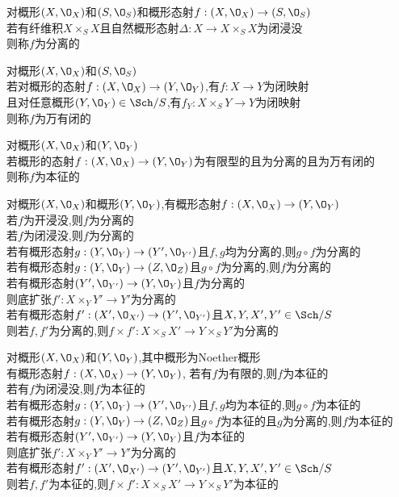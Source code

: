 \begin{dingyi}
对概形$(X,\O_{X})$和$(S,\O_{S})$和概形态射$f:(X,\O_{X})\to(S,\O_{S})$\\
若有纤维积$X\times_{S}X$且自然概形态射$\Delta:X\to X\times_{S}X$为闭浸没\\
则称$f$为分离的
\end{dingyi}

\begin{dingyi}
对概形$(X,\O_{X})$和$(S,\O_{S})$\\
若对概形的态射$f:(X,\O_{X})\to (Y,\O_{Y})$,有$f:X\to Y$为闭映射\\
且对任意概形$(Y,\O_{Y})\in\Sch/S$,有$f_{Y}:X\times_{S}Y\to Y$为闭映射\\
则称$f$为万有闭的
\end{dingyi}

\begin{dingyi}
对概形$(X,\O_{X})$和$(Y,\O_{Y})$\\
若概形的态射$f:(X,\O_{X})\to (Y,\O_{Y})$为有限型的且为分离的且为万有闭的\\
则称$f$为本征的
\end{dingyi}

\begin{dingli}
对概形$(X,\O_{X})$和概形$(Y,\O_{Y})$,有概形态射$f:(X,\O_{X})\to(Y,\O_{Y})$\\
若$f$为开浸没,则$f$为分离的\\
若$f$为闭浸没,则$f$为分离的\\
若有概形态射$g:(Y,\O_{Y})\to(Y',\O_{Y'})$且$f,g$均为分离的,则$g\circ f$为分离的\\
若有概形态射$g:(Y,\O_{Y})\to (Z,\O_{Z})$且$g\circ f$为分离的,则$f$为分离的\\
若有概形态射$(Y',\O_{Y'})\to (Y,\O_{Y})$且$f$为分离的\\
则底扩张$f':X\times_{Y} Y'\to Y'$为分离的\\
若有概形态射$f':(X',\O_{X'})\to (Y',\O_{Y'})$且$X,Y,X',Y'\in \Sch/S$\\
则若$f,f'$为分离的,则$f\times f':X\times_{S} X'\to Y\times_{S} Y'$为分离的
\end{dingli}

\begin{dingli}
对概形$(X,\O_{X})$和$(Y,\O_{Y})$,其中概形为Noether概形\\
有概形态射$f:(X,\O_{X})\to (Y,\O_{Y})$,
若有$f$为有限的,则$f$为本征的\\
若有$f$为闭浸没,则$f$为本征的\\
若有概形态射$g:(Y,\O_{Y})\to(Y',\O_{Y'})$且$f,g$均为本征的,则$g\circ f$为本征的\\
若有概形态射$g:(Y,\O_{Y})\to (Z,\O_{Z})$且$g\circ f$为本征的且$g$为分离的,则$f$为本征的\\
若有概形态射$(Y',\O_{Y'})\to (Y,\O_{Y})$且$f$为本征的\\
则底扩张$f':X\times_{Y} Y'\to Y'$为分离的\\
若有概形态射$f':(X',\O_{X'})\to (Y',\O_{Y'})$且$X,Y,X',Y'\in \Sch/S$\\
则若$f,f'$为本征的,则$f\times f':X\times_{S} X'\to Y\times_{S} Y'$为本征的
\end{dingli}

